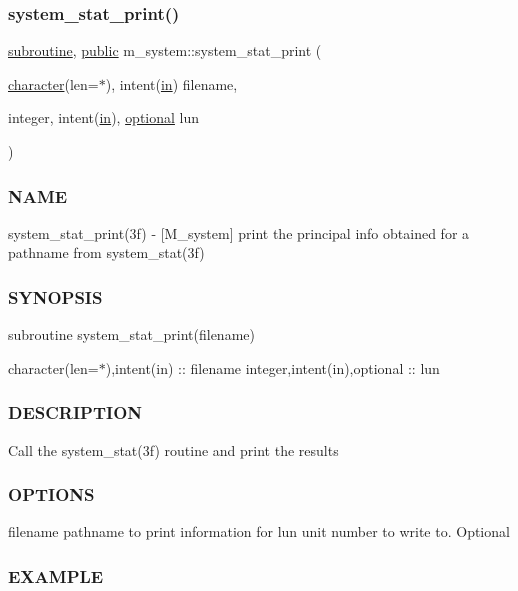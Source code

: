 \subsubsection{\texorpdfstring{system\+\_\+stat\+\_\+print()}{system\_stat\_print()}}
{\footnotesize\ttfamily \hyperlink{M__stopwatch_83_8txt_acfbcff50169d691ff02d4a123ed70482}{subroutine}, \hyperlink{M__stopwatch_83_8txt_a2f74811300c361e53b430611a7d1769f}{public} m\+\_\+system\+::system\+\_\+stat\+\_\+print (\begin{DoxyParamCaption}\item[{\hyperlink{option__stopwatch_83_8txt_abd4b21fbbd175834027b5224bfe97e66}{character}(len=$\ast$), intent(\hyperlink{M__journal_83_8txt_afce72651d1eed785a2132bee863b2f38}{in})}]{filename,  }\item[{integer, intent(\hyperlink{M__journal_83_8txt_afce72651d1eed785a2132bee863b2f38}{in}), \hyperlink{option__stopwatch_83_8txt_aa4ece75e7acf58a4843f70fe18c3ade5}{optional}}]{lun }\end{DoxyParamCaption})}



\subsubsection*{N\+A\+ME}

system\+\_\+stat\+\_\+print(3f) -\/ \mbox{[}M\+\_\+system\mbox{]} print the principal info obtained for a pathname from system\+\_\+stat(3f) \subsubsection*{S\+Y\+N\+O\+P\+S\+IS}

subroutine system\+\_\+stat\+\_\+print(filename)

character(len=$\ast$),intent(in) \+:\+: filename integer,intent(in),optional \+:\+: lun \subsubsection*{D\+E\+S\+C\+R\+I\+P\+T\+I\+ON}

Call the system\+\_\+stat(3f) routine and print the results \subsubsection*{O\+P\+T\+I\+O\+NS}

filename pathname to print information for lun unit number to write to. Optional \subsubsection*{E\+X\+A\+M\+P\+LE}

